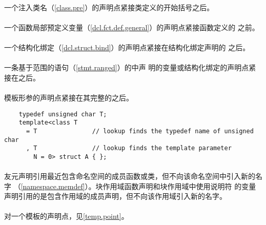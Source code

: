\paragraph{} %
一个注入类名（\ref{class.pre}）的声明点紧接类定义的开始括号之后。

\paragraph{} %
一个函数局部预定义变量（\ref{dcl.fct.def.general}）的声明点紧接函数定义的
之前。

\paragraph{} %
一个结构化绑定（\ref{dcl.struct.bind}）的声明点紧接在结构化绑定声明的
之后。

\paragraph{} %
一条基于范围的语句（\ref{stmt.ranged}）的中声
明的变量或结构化绑定的声明点紧接在之后。

\paragraph{} %
模板形参的声明点紧接在其完整的之后。

\begin{example} %
  \begin{lstlisting}
    typedef unsigned char T;
    template<class T
      = T               // lookup finds the typedef name of unsigned char
      , T               // lookup finds the template parameter
        N = 0> struct A { };
  \end{lstlisting}
\end{example}

\paragraph{} %
\begin{note} %
  友元声明引用最近包含命名空间的成员函数或类，但不向该命名空间中引入新的名字
  （\ref{namespace.memdef}）。块作用域函数声明和块作用域中使用说明符
  的变量声明引用的是包含作用域的成员声明，但不向该作用域引入新的名字。
\end{note}

\paragraph{} %
\begin{note} %
  对一个模板的声明点，见\ref{temp.point}。
\end{note}
